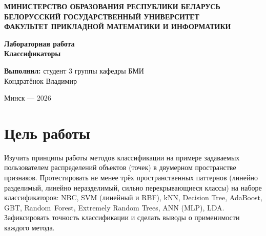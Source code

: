 \documentclass[14pt,a4paper]{extarticle}
\begin{document}
\begin{titlepage}
  \begin{center}
    \textbf{МИНИСТЕРСТВО ОБРАЗОВАНИЯ РЕСПУБЛИКИ БЕЛАРУСЬ}\\[2pt]
    \textbf{БЕЛОРУССКИЙ ГОСУДАРСТВЕННЫЙ УНИВЕРСИТЕТ}\\[2pt]
    \textbf{ФАКУЛЬТЕТ ПРИКЛАДНОЙ МАТЕМАТИКИ И ИНФОРМАТИКИ}\\[2pt]
  \end{center}

  \vspace{2cm}

  \begin{center}
    \Large\textbf{Лабораторная работа }\\[6pt]
    \large\textbf{Классификаторы}
  \end{center}

  \vspace{3cm}

  \begin{flushright}
    \textbf{Выполнил:} студент 3 группы кафедры БМИ\\[4pt]
    Кондратёнок Владимир\\[4pt]
  \end{flushright}

  \vfill

  \begin{center}
    Минск --- 2026
  \end{center}
\end{titlepage}

\section*{Цель работы}

Изучить принципы работы методов классификации на примере задаваемых пользователем
распределений объектов (точек) в двумерном пространстве признаков.
Протестировать не менее трёх пространственных паттернов (линейно разделимый,
линейно неразделимый, сильно перекрывающиеся классы) на наборе классификаторов:
NBC, SVM (линейный и RBF), kNN, Decision Tree, AdaBoost, GBT, Random~Forest,
Extremely Random Trees, ANN (MLP), LDA.
Зафиксировать точность классификации и сделать выводы о применимости каждого метода.
\end{document}
